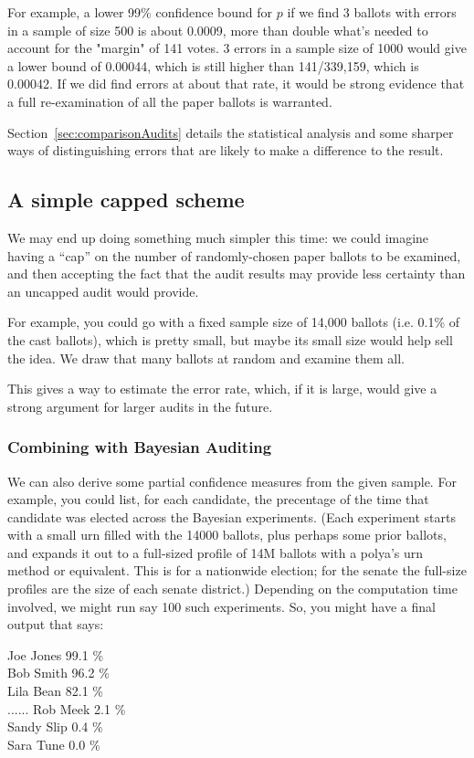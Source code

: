 \documentclass[10pt,a4paper]{article}
\begin{document}
For example, a lower 99\% confidence bound for $p$ if we find 3 ballots with errors in a sample of size 500 is about 0.0009, more than double
what's needed to account for the "margin" of 141 votes. 3 errors in a sample size of 1000 would give a lower bound of 0.00044, which is still higher than
141/339,159, which is 0.00042.  If we did find errors at about that rate, it would be strong evidence that a full re-examination of all the paper ballots is warranted.

Section~\ref{sec:comparisonAudits} details the statistical analysis and some sharper ways of distinguishing errors that are likely to make a difference to the result.

\subsection{A simple capped scheme}
We may end up doing something much simpler this time: we
could imagine having a ``cap'' on the number of randomly-chosen 
paper ballots to be examined, and then accepting the fact that
the audit results may provide less certainty than an uncapped
audit would provide.

For example, you could go with a fixed sample size of 14,000
ballots (i.e. 0.1\% of the cast ballots), which is pretty small, but
maybe its small size would help sell the idea.  We draw that
many ballots at random and examine them all.

This gives a way to estimate the error rate, which, if it is large, would give a strong argument for larger audits in the
future.

\subsubsection{Combining with Bayesian Auditing}
We can also derive some partial confidence measures from the
given sample.  For example, you could list, for each candidate,
the precentage of the time that candidate was elected across the Bayesian
experiments.  (Each experiment starts with a small urn filled with
the 14000 ballots, plus perhaps some prior ballots, and expands
it out to a full-sized profile of 14M ballots with a polya's urn
method or equivalent.  This is for a nationwide election; for the
senate the full-size profiles are the size of each senate district.)
Depending on the computation time involved, we might run say
100 such experiments.  So, you might have a final output that says:

Joe Jones     99.1 \% \\
Bob Smith     96.2 \% \\
Lila Bean       82.1 \% \\
......
Rob Meek        2.1 \% \\ 
Sandy Slip       0.4 \%   \\
Sara Tune        0.0 \%   \\
\end{document}

